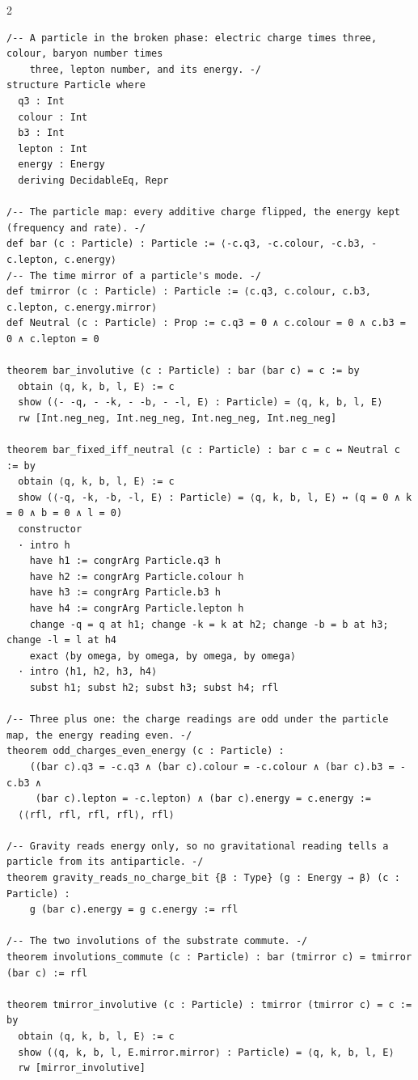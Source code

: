 \documentclass[10pt]{article}
\begin{document}
\begin{multicols}{2}
\begin{Verbatim}[fontsize=\fontsize{6.0}{6.9}\selectfont,breaklines,breakanywhere,breaksymbolleft={}]
/-- A particle in the broken phase: electric charge times three, colour, baryon number times
    three, lepton number, and its energy. -/
structure Particle where
  q3 : Int
  colour : Int
  b3 : Int
  lepton : Int
  energy : Energy
  deriving DecidableEq, Repr

/-- The particle map: every additive charge flipped, the energy kept (frequency and rate). -/
def bar (c : Particle) : Particle := ⟨-c.q3, -c.colour, -c.b3, -c.lepton, c.energy⟩
/-- The time mirror of a particle's mode. -/
def tmirror (c : Particle) : Particle := ⟨c.q3, c.colour, c.b3, c.lepton, c.energy.mirror⟩
def Neutral (c : Particle) : Prop := c.q3 = 0 ∧ c.colour = 0 ∧ c.b3 = 0 ∧ c.lepton = 0

theorem bar_involutive (c : Particle) : bar (bar c) = c := by
  obtain ⟨q, k, b, l, E⟩ := c
  show (⟨- -q, - -k, - -b, - -l, E⟩ : Particle) = ⟨q, k, b, l, E⟩
  rw [Int.neg_neg, Int.neg_neg, Int.neg_neg, Int.neg_neg]

theorem bar_fixed_iff_neutral (c : Particle) : bar c = c ↔ Neutral c := by
  obtain ⟨q, k, b, l, E⟩ := c
  show (⟨-q, -k, -b, -l, E⟩ : Particle) = ⟨q, k, b, l, E⟩ ↔ (q = 0 ∧ k = 0 ∧ b = 0 ∧ l = 0)
  constructor
  · intro h
    have h1 := congrArg Particle.q3 h
    have h2 := congrArg Particle.colour h
    have h3 := congrArg Particle.b3 h
    have h4 := congrArg Particle.lepton h
    change -q = q at h1; change -k = k at h2; change -b = b at h3; change -l = l at h4
    exact ⟨by omega, by omega, by omega, by omega⟩
  · intro ⟨h1, h2, h3, h4⟩
    subst h1; subst h2; subst h3; subst h4; rfl

/-- Three plus one: the charge readings are odd under the particle map, the energy reading even. -/
theorem odd_charges_even_energy (c : Particle) :
    ((bar c).q3 = -c.q3 ∧ (bar c).colour = -c.colour ∧ (bar c).b3 = -c.b3 ∧
     (bar c).lepton = -c.lepton) ∧ (bar c).energy = c.energy :=
  ⟨⟨rfl, rfl, rfl, rfl⟩, rfl⟩

/-- Gravity reads energy only, so no gravitational reading tells a particle from its antiparticle. -/
theorem gravity_reads_no_charge_bit {β : Type} (g : Energy → β) (c : Particle) :
    g (bar c).energy = g c.energy := rfl

/-- The two involutions of the substrate commute. -/
theorem involutions_commute (c : Particle) : bar (tmirror c) = tmirror (bar c) := rfl

theorem tmirror_involutive (c : Particle) : tmirror (tmirror c) = c := by
  obtain ⟨q, k, b, l, E⟩ := c
  show (⟨q, k, b, l, E.mirror.mirror⟩ : Particle) = ⟨q, k, b, l, E⟩
  rw [mirror_involutive]


\end{Verbatim}
\end{multicols}
\end{document}
